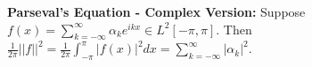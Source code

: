 {\bf Parseval's Equation - Complex Version: } Suppose $f(x)=\sum_{k=-\infty}^{\infty} \alpha_ke^{ikx}\in L^2[-\pi,\pi]$. Then $\frac{1}{2\pi}||f||^2=\frac{1}{2\pi}\int_{-\pi}^{\pi}|f(x)|^2dx=\sum_{k=-\infty}^{\infty}|\alpha_k|^2$.